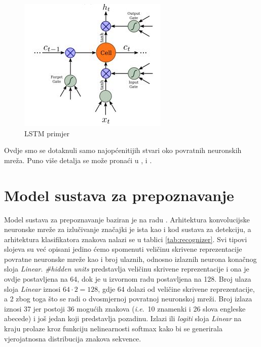 \documentclass[times, utf8, diplomski]{fer}
\begin{document}
\begin{figure}[H]
    \centering
    \includegraphics[scale=0.7]{figures/recognizer/lstm.jpg}
    \caption[Caption for LOF]{LSTM primjer\footnotemark}
    \label{fig:lstm}
\end{figure}

Ovdje smo se dotaknuli samo najopćenitijih stvari oko povratnih neuronskih mreža. Puno više detalja se može pronaći u \citep{duboko}, \citep{Goodfellow-et-al-2016} i \citep{rnn-paper}.

\section{Model sustava za prepoznavanje}
Model sustava za prepoznavanje baziran je na radu \citep{crnn-paper}. Arhitektura konvolucijske neuronske mreže za izlučivanje značajki je ista kao i kod sustava za detekciju, a arhitektura klasifikatora znakova nalazi se u tablici \ref{tab:recognizer}. Svi tipovi slojeva su već opisani jedino ćemo spomenuti veličinu skrivene reprezentacije povratne neuronske mreže kao i broj ulaznih, odnosno izlaznih neurona konačnog sloja \textit{Linear}. \textit{\#hidden units} predstavlja veličinu skrivene reprezentacije i ona je ovdje postavljena na 64, dok je u izvornom radu postavljena na 128. Broj ulaza sloja \textit{Linear} iznosi $64\cdot2 = 128$, gdje 64 dolazi od veličine skrivene reprezentacije, a 2 zbog toga što se radi o dvosmjernoj povratnoj neuronskoj mreži. Broj izlaza iznosi 37 jer postoji 36 mogućih znakova (\textit{i.e}.\ 10 znamenki i 26 slova engleske abecede) i još jedan koji predstavlja pozadinu. Izlazi ili \textit{logiti} sloja \textit{Linear} na kraju prolaze kroz funkciju nelinearnosti softmax kako bi se generirala vjerojatnosna distribucija znakova sekvence.
\end{document}
